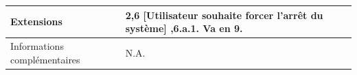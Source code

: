 \begin{longtable}[l]{|p{3cm}|p{11.7cm}|}
    Extensions & \newline
        \textbf{2,6 [Utilisateur souhaite forcer l'arrêt du système]} \newline
        2,6.a.1. Va en 9. \newline
        \newline
        \\
    \hline
        Informations \newline complémentaires & N.A. \\
    \hline

\end{longtable}
